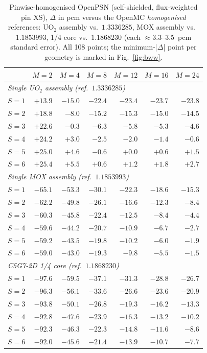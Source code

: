 \documentclass[11pt,a4paper]{article}
\begin{document}
\begin{table}[h]
\centering
\caption{Pinwise-homogenised OpenPSN (self-shielded, flux-weighted pin XS), $\Delta$ in pcm versus the
OpenMC \emph{homogenised} references: UO$_2$ assembly vs.\ $1.3336285$,
MOX assembly vs.\ $1.1853993$, 1/4 core vs.\ $1.1868230$ (each
$\approx$3.3--3.5~pcm standard error). All 108 points; the minimum-|$\Delta$|
point per geometry is marked in Fig.~\ref{fig:bww}.}
\label{tab:bww}
\small
\begin{tabular}{lrrrrrr}
\toprule
 & $M{=}2$ & $M{=}4$ & $M{=}8$ & $M{=}12$ & $M{=}16$ & $M{=}24$ \\
\midrule
\multicolumn{7}{l}{\emph{Single UO$_2$ assembly (ref.\ $1.3336285$)}}\\
$S{=}1$ & $+13.9$ & $-15.0$ & $-22.4$ & $-23.4$ & $-23.7$ & $-23.8$ \\
$S{=}2$ & $+18.8$ & $-8.0$ & $-15.2$ & $-15.3$ & $-15.0$ & $-14.5$ \\
$S{=}3$ & $+22.6$ & $-0.3$ & $-6.3$ & $-5.8$ & $-5.3$ & $-4.6$ \\
$S{=}4$ & $+24.2$ & $+3.0$ & $-2.5$ & $-2.0$ & $-1.4$ & $-0.6$ \\
$S{=}5$ & $+25.0$ & $+4.6$ & $-0.6$ & $+0.0$ & $+0.6$ & $+1.5$ \\
$S{=}6$ & $+25.4$ & $+5.5$ & $+0.6$ & $+1.2$ & $+1.8$ & $+2.7$ \\
\midrule
\multicolumn{7}{l}{\emph{Single MOX assembly (ref.\ $1.1853993$)}}\\
$S{=}1$ & $-65.1$ & $-53.3$ & $-30.1$ & $-22.3$ & $-18.6$ & $-15.3$ \\
$S{=}2$ & $-62.2$ & $-49.8$ & $-26.1$ & $-16.6$ & $-12.3$ & $-8.4$ \\
$S{=}3$ & $-60.3$ & $-45.8$ & $-22.4$ & $-12.5$ & $-8.4$ & $-4.4$ \\
$S{=}4$ & $-59.6$ & $-44.2$ & $-20.7$ & $-10.9$ & $-6.7$ & $-2.7$ \\
$S{=}5$ & $-59.2$ & $-43.5$ & $-19.8$ & $-10.2$ & $-6.0$ & $-1.9$ \\
$S{=}6$ & $-59.0$ & $-43.0$ & $-19.3$ & $-9.8$ & $-5.5$ & $-1.5$ \\
\midrule
\multicolumn{7}{l}{\emph{C5G7-2D 1/4 core (ref.\ $1.1868230$)}}\\
$S{=}1$ & $-97.6$ & $-59.5$ & $-37.1$ & $-31.3$ & $-28.8$ & $-26.7$ \\
$S{=}2$ & $-96.3$ & $-56.1$ & $-33.6$ & $-26.6$ & $-23.6$ & $-20.9$ \\
$S{=}3$ & $-93.8$ & $-50.1$ & $-26.8$ & $-19.3$ & $-16.2$ & $-13.3$ \\
$S{=}4$ & $-92.8$ & $-47.6$ & $-23.9$ & $-16.3$ & $-13.2$ & $-10.2$ \\
$S{=}5$ & $-92.3$ & $-46.3$ & $-22.3$ & $-14.8$ & $-11.6$ & $-8.6$ \\
$S{=}6$ & $-92.0$ & $-45.6$ & $-21.4$ & $-13.9$ & $-10.7$ & $-7.7$ \\
\bottomrule
\end{tabular}
\end{table}
\end{document}
